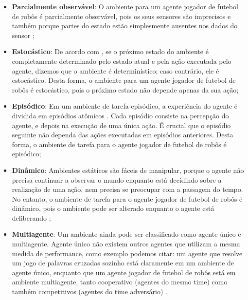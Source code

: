 \begin{itemize}
    \item \textbf{Parcialmente observável}: O ambiente para um agente jogador de futebol de robôs é
    parcialmente observável, pois os seus sensores são imprecisos e também porque partes do estado
    estão simplesmente ausentes nos dados do sensor \cite{schmill2000learning};
    
    \item \textbf{Estocástico}: De acordo com , se o próximo
    estado do ambiente é completamente determinado pelo estado atual e pela ação executada pelo
    agente, dizemos que o ambiente é determinístico; caso contrário, ele é estocástico. Desta forma,
    o ambiente para um agente jogador de futebol de robôs é estocástico, pois o próximo estado não
    depende apenas da sua ação;
    
    \item \textbf{Episódico}: Em um ambiente de tarefa episódico, a experiência do agente é dividida
    em episódios atômicos \cite{wooldridge2001intelligent}. Cada episódio consiste na percepção do
    agente, e depois na execução de uma única ação. É crucial que o episódio seguinte não dependa
    das ações executadas em episódios anteriores. Desta forma, o ambiente de tarefa para o agente
    jogador de futebol de robôs é episódico;
    
    \item \textbf{Dinâmico}: Ambientes estáticos são fáceis de manipular, porque o agente não
    precisa continuar a observar o mundo enquanto está decidindo sobre a realização de uma ação, nem
    precisa se preocupar com a passagem do tempo. No entanto, o ambiente de tarefa para o agente
    jogador de futebol de robôs é dinâmico, pois o ambiente pode ser alterado enquanto o agente está
    deliberando \cite{franklin1996agent};
    
    \item \textbf{Multiagente}: Um ambiente ainda pode ser classificado como agente único e
    multiagente. Agente único não existem outros agentes que utilizam a mesma medida de performance,
    como exemplo podemos citar: um agente que resolve um jogo de palavras cruzadas sozinho está
    claramente em um ambiente de agente único, enquanto que um agente jogador de futebol de robôs
    está em ambiente multiagente, tanto cooperativo (agentes do mesmo time) como também competitivos
    (agentes do time adversário) \cite{poggi1996multi}. 

\end{itemize}

